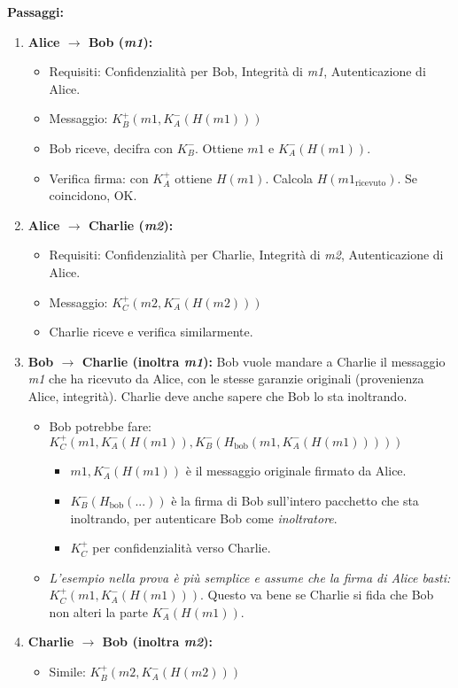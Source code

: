 \textbf{Passaggi:}
\begin{enumerate}[label=\arabic*.]
    \item \textbf{Alice $\to$ Bob (\textit{m1}):}
    \begin{itemize}
        \item Requisiti: Confidenzialità per Bob, Integrità di \textit{m1}, Autenticazione di Alice.
        \item Messaggio: $K_B^+(m1, K_A^-(H(m1)))$
        \item Bob riceve, decifra con $K_B^-$. Ottiene $m1$ e $K_A^-(H(m1))$.
        \item Verifica firma: con $K_A^+$ ottiene $H(m1)$. Calcola $H(m1_{\text{ricevuto}})$. Se coincidono, OK.
    \end{itemize}
    \item \textbf{Alice $\to$ Charlie (\textit{m2}):}
    \begin{itemize}
        \item Requisiti: Confidenzialità per Charlie, Integrità di \textit{m2}, Autenticazione di Alice.
        \item Messaggio: $K_C^+(m2, K_A^-(H(m2)))$
        \item Charlie riceve e verifica similarmente.
    \end{itemize}
    \item \textbf{Bob $\to$ Charlie (inoltra \textit{m1}):}
    Bob vuole mandare a Charlie il messaggio \textit{m1} che ha ricevuto da Alice, con le stesse garanzie originali (provenienza Alice, integrità). Charlie deve anche sapere che Bob lo sta inoltrando.
    \begin{itemize}
        \item Bob potrebbe fare: $K_C^+( m1, K_A^-(H(m1)), K_B^-(H_{\text{bob}}(m1, K_A^-(H(m1)))) )$
        \begin{itemize}
            \item $m1, K_A^-(H(m1))$ è il messaggio originale firmato da Alice.
            \item $K_B^-(H_{\text{bob}}(...))$ è la firma di Bob sull'intero pacchetto che sta inoltrando, per autenticare Bob come \textit{inoltratore}.
            \item $K_C^+$ per confidenzialità verso Charlie.
        \end{itemize}
        \item \textit{L'esempio nella prova è più semplice e assume che la firma di Alice basti:} $K_C^+(m1, K_A^-(H(m1)))$. Questo va bene se Charlie si fida che Bob non alteri la parte $K_A^-(H(m1))$.
    \end{itemize}
    \item \textbf{Charlie $\to$ Bob (inoltra \textit{m2}):}
    \begin{itemize}
        \item Simile: $K_B^+(m2, K_A^-(H(m2)))$
    \end{itemize}
\end{enumerate}

